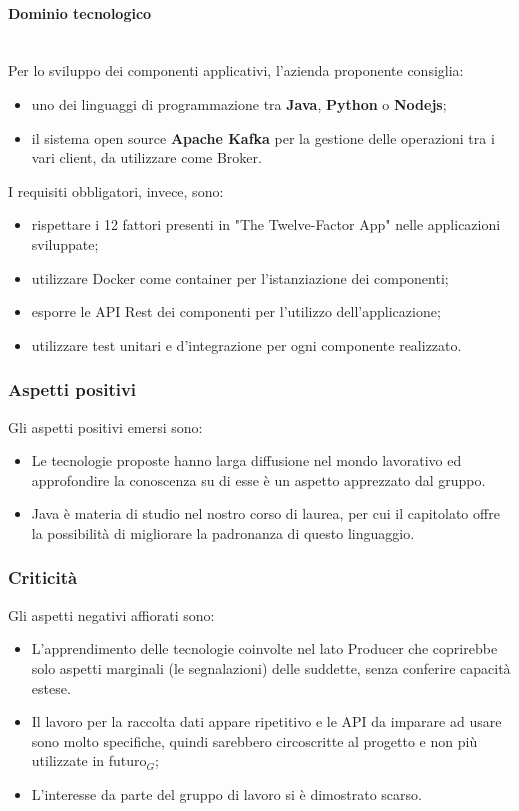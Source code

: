\paragraph{Dominio tecnologico}\mbox{}\\
Per lo sviluppo dei componenti applicativi, l'azienda proponente consiglia:
\begin{itemize}
	\item uno dei linguaggi di programmazione tra \textbf{Java},
	\textbf{Python} o \textbf{Nodejs};
	\item il sistema open source \textbf{Apache Kafka} per la gestione delle
	operazioni tra i vari client, da utilizzare come Broker.
\end{itemize}
I requisiti obbligatori, invece, sono:
\begin{itemize}
	\item rispettare i 12 fattori presenti in "The Twelve-Factor App" nelle 
	applicazioni sviluppate;
	\item utilizzare Docker come container per l'istanziazione dei componenti;
	\item esporre le API Rest dei componenti per l'utilizzo dell'applicazione; 
	\item utilizzare test unitari e d'integrazione per ogni componente 
	realizzato.
\end{itemize}
\subsubsection{Aspetti positivi}
Gli aspetti positivi emersi sono:
\begin{itemize}
	\item Le tecnologie proposte hanno larga diffusione nel mondo lavorativo ed
	 approfondire la conoscenza su di esse è un aspetto apprezzato dal gruppo.
	\item Java è materia di studio nel nostro corso di laurea, per cui il
	 capitolato offre la possibilità di migliorare la padronanza di questo
	 linguaggio.
\end{itemize}
\subsubsection{Criticità}
Gli aspetti negativi affiorati sono: 
\begin{itemize}
	\item L'apprendimento delle tecnologie coinvolte nel lato Producer che
	 coprirebbe solo aspetti marginali (le segnalazioni) delle suddette, 
	 senza conferire capacità estese. 
	\item Il lavoro per la raccolta dati appare ripetitivo e le
	 API da imparare ad usare sono molto specifiche, quindi sarebbero 
	 circoscritte al progetto e non più utilizzate in futuro$_{G}$;
	\item L'interesse da parte del gruppo di lavoro si è dimostrato scarso.
	
\end{itemize}
